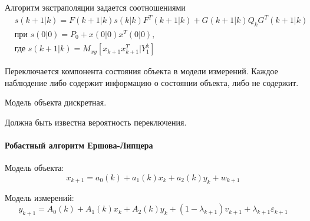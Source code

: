 \documentclass[a4paper,12pt]{article}
\begin{document}
Алгоритм экстраполяции задается соотношениями
\begin{equation*}
	\begin{split}
	&s(k+1|k) = F(k+1|k) s(k|k) F^T(k+1|k) + G(k+1|k) Q_k G^T(k+1|k) \\
	&\mbox{при } s(0|0) = P_0 + x(0|0) x^T(0|0), \\
	&\mbox{где } s(k+1|k) = M_{xy}[ x_{k+1} x^T_{k+1} | Y^k_1 ]
	\end{split}
\end{equation*}

Переключается компонента состояния объекта в модели измерений. Каждое
наблюдение либо содержит информацию о состоянии объекта, либо не содержит.

Модель объекта дискретная.

Должна быть известна вероятность переключения.

\paragraph{Робастный алгоритм Ершова-Липцера\\}

Модель объекта:
\[ x_{k+1} = a_0(k) + a_1(k)x_k + a_2(k) y_k + w_{k+1} \]

Модель измерений:
\begin{equation*}
	y_{k+1} = A_0(k) + A_1(k) x_k + A_2(k) y_k
	+ (1 - \lambda_{k+1}) v_{k+1} + \lambda_{k+1} \varepsilon_{k+1}
\end{equation*}
\end{document}

